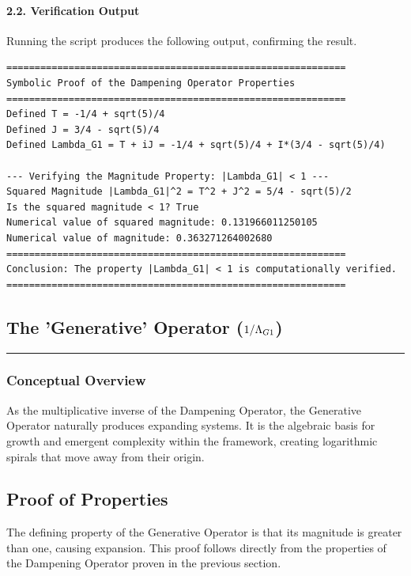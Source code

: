 \paragraph{2.2. Verification Output}
Running the script produces the following output, confirming the result.
\begin{verbatim}
============================================================
Symbolic Proof of the Dampening Operator Properties
============================================================
Defined T = -1/4 + sqrt(5)/4
Defined J = 3/4 - sqrt(5)/4
Defined Lambda_G1 = T + iJ = -1/4 + sqrt(5)/4 + I*(3/4 - sqrt(5)/4)

--- Verifying the Magnitude Property: |Lambda_G1| < 1 ---
Squared Magnitude |Lambda_G1|^2 = T^2 + J^2 = 5/4 - sqrt(5)/2
Is the squared magnitude < 1? True
Numerical value of squared magnitude: 0.131966011250105
Numerical value of magnitude: 0.363271264002680
============================================================
Conclusion: The property |Lambda_G1| < 1 is computationally verified.
============================================================
\end{verbatim}


\subsection*{The 'Generative' Operator ($1/\Lambda_{G1}$)}
\hrule
\vspace{0.3cm}
\vspace{0.5cm}

\subsubsection*{Conceptual Overview}
As the multiplicative inverse of the Dampening Operator, the Generative Operator naturally produces expanding systems. It is the algebraic basis for growth and emergent complexity within the framework, creating logarithmic spirals that move away from their origin.

\subsection*{Proof of Properties}
The defining property of the Generative Operator is that its magnitude is greater than one, causing expansion. This proof follows directly from the properties of the Dampening Operator proven in the previous section.

